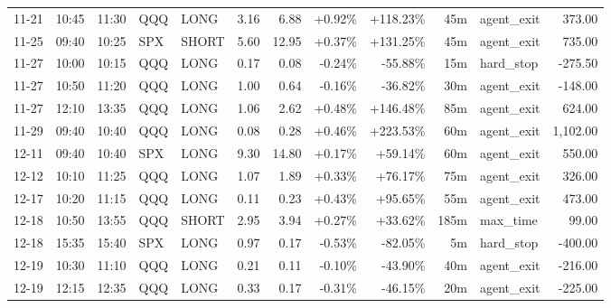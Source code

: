 \documentclass[11pt,a4paper,twoside]{article}
\begin{document}
\begin{center}
\begin{longtable}{>{\color{txtmain}}l l l l l r r r r r >{\color{txtmain}}l r}
11-21 & 10:45 & 11:30 & QQQ & LONG & 3.16 & 6.88 & \textcolor{wingreen}{+0.92\%} & \textcolor{wingreen}{+118.23\%} & 45m & agent\_exit & \textcolor{wingreen}{373.00} \\
11-25 & 09:40 & 10:25 & SPX & SHORT & 5.60 & 12.95 & \textcolor{wingreen}{+0.37\%} & \textcolor{wingreen}{+131.25\%} & 45m & agent\_exit & \textcolor{wingreen}{735.00} \\
11-27 & 10:00 & 10:15 & QQQ & LONG & 0.17 & 0.08 & \textcolor{lossred}{-0.24\%} & \textcolor{lossred}{-55.88\%} & 15m & hard\_stop & \textcolor{lossred}{-275.50} \\
11-27 & 10:50 & 11:20 & QQQ & LONG & 1.00 & 0.64 & \textcolor{lossred}{-0.16\%} & \textcolor{lossred}{-36.82\%} & 30m & agent\_exit & \textcolor{lossred}{-148.00} \\
11-27 & 12:10 & 13:35 & QQQ & LONG & 1.06 & 2.62 & \textcolor{wingreen}{+0.48\%} & \textcolor{wingreen}{+146.48\%} & 85m & agent\_exit & \textcolor{wingreen}{624.00} \\
11-29 & 09:40 & 10:40 & QQQ & LONG & 0.08 & 0.28 & \textcolor{wingreen}{+0.46\%} & \textcolor{wingreen}{+223.53\%} & 60m & agent\_exit & \textcolor{wingreen}{1,102.00} \\
12-11 & 09:40 & 10:40 & SPX & LONG & 9.30 & 14.80 & \textcolor{wingreen}{+0.17\%} & \textcolor{wingreen}{+59.14\%} & 60m & agent\_exit & \textcolor{wingreen}{550.00} \\
12-12 & 10:10 & 11:25 & QQQ & LONG & 1.07 & 1.89 & \textcolor{wingreen}{+0.33\%} & \textcolor{wingreen}{+76.17\%} & 75m & agent\_exit & \textcolor{wingreen}{326.00} \\
12-17 & 10:20 & 11:15 & QQQ & LONG & 0.11 & 0.23 & \textcolor{wingreen}{+0.43\%} & \textcolor{wingreen}{+95.65\%} & 55m & agent\_exit & \textcolor{wingreen}{473.00} \\
12-18 & 10:50 & 13:55 & QQQ & SHORT & 2.95 & 3.94 & \textcolor{wingreen}{+0.27\%} & \textcolor{wingreen}{+33.62\%} & 185m & max\_time & \textcolor{wingreen}{99.00} \\
12-18 & 15:35 & 15:40 & SPX & LONG & 0.97 & 0.17 & \textcolor{lossred}{-0.53\%} & \textcolor{lossred}{-82.05\%} & 5m & hard\_stop & \textcolor{lossred}{-400.00} \\
12-19 & 10:30 & 11:10 & QQQ & LONG & 0.21 & 0.11 & \textcolor{lossred}{-0.10\%} & \textcolor{lossred}{-43.90\%} & 40m & agent\_exit & \textcolor{lossred}{-216.00} \\
12-19 & 12:15 & 12:35 & QQQ & LONG & 0.33 & 0.17 & \textcolor{lossred}{-0.31\%} & \textcolor{lossred}{-46.15\%} & 20m & agent\_exit & \textcolor{lossred}{-225.00} \\

\end{longtable}
\end{center}
\end{document}
